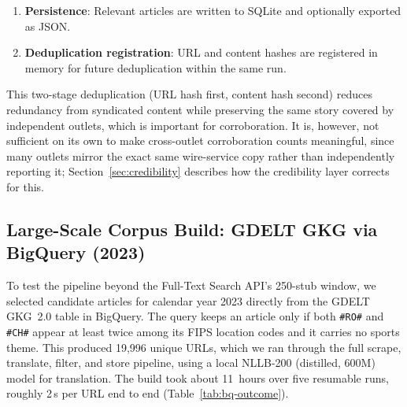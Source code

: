 \documentclass[conference]{IEEEtran}
\begin{document}
\begin{enumerate}
        explicit sports-section tags). This was added after full-text
        scraping surfaced a real failure mode: a genuine China-vs-Romania
        table-tennis match report satisfies plain co-occurrence, but sports
        results are out of scope for this project's 11-type bilateral
        \emph{relations} ontology, and a multi-match roundup article can leak
        an unrelated match's sentence into event extraction. On the current
        corpus, this excluded 8 of 112 previously-relevant articles (three
        table-tennis reports, a judo report, and coverage of the World
        Aquatics Championships), and eliminated one of the corpus's 17
        contradictory claim groups that traced directly to this failure mode.
  \item \textbf{Persistence}: Relevant articles are written to SQLite
        and optionally exported as JSON.
  \item \textbf{Deduplication registration}: URL and content hashes are
        registered in memory for future deduplication within the same run.
\end{enumerate}

This two-stage deduplication (URL hash first, content hash second) reduces
redundancy from syndicated content while preserving the same story covered
by independent outlets, which is important for corroboration. It is,
however, not sufficient on its own to make cross-outlet corroboration
counts meaningful, since many outlets mirror the exact same wire-service
copy rather than independently reporting it; Section~\ref{sec:credibility}
describes how the credibility layer corrects for this.

\subsection{Large-Scale Corpus Build: GDELT GKG via BigQuery (2023)}
\label{sec:bq-corpus}

To test the pipeline beyond the Full-Text Search API's 250-stub window, we
selected candidate articles for calendar year 2023 directly from the GDELT
GKG~2.0 table in BigQuery. The query keeps an article only if both
\texttt{\#RO\#} and \texttt{\#CH\#} appear at least twice among its FIPS
location codes and it carries no sports theme. This produced 19,996 unique
URLs, which we ran through the full scrape, translate, filter, and store
pipeline, using a local NLLB-200 (distilled, 600M) model for translation.
The build took about 11~hours over five resumable runs, roughly 2\,s per URL
end to end (Table~\ref{tab:bq-outcome}).
\end{document}
